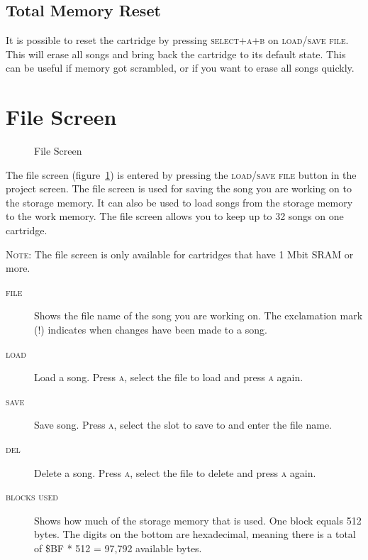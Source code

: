 \subsection{Total Memory Reset}
\label{total-memory-reset}

It is possible to reset the cartridge by pressing \textsc{select+a+b} on \textsc{load/save file}. This will erase all songs and bring back the cartridge to its default state. This can be useful if memory got scrambled, or if you want to erase all songs quickly.

\section{File Screen}

\begin{figure}[htpb]
	\begin{center}
	\end{center}
	\caption{File Screen}
	\label{fig:file}
\end{figure}

The file screen (figure~\ref{fig:file}) is entered by pressing the \textsc{load/save file} button in the project screen. The file screen is used for saving the song you are working on to the storage memory. It can also be used to load songs from the storage memory to the work memory. The file screen allows you to keep up to 32 songs on one cartridge.

\textsc{Note}: The file screen is only available for cartridges that have 1 Mbit SRAM or more.

\begin{description}
	\item[\textsc{file}] Shows the file name of the song you are working on. The exclamation mark (\textsc{!}) indicates when changes have been made to a song.
	\item[\textsc{load}] Load a song. Press \textsc{a}, select the file to load and press \textsc{a} again.
	\item[\textsc{save}] Save song. Press \textsc{a}, select the slot to save to and enter the file name.
	\item[\textsc{del}] Delete a song. Press \textsc{a}, select the file to delete and press \textsc{a} again.
	\item[\textsc{blocks used}] Shows how much of the storage memory that is used. One block equals 512 bytes. The digits on the bottom are hexadecimal, meaning there is a total of \$BF * 512 = 97,792 available bytes.
\end{description}

